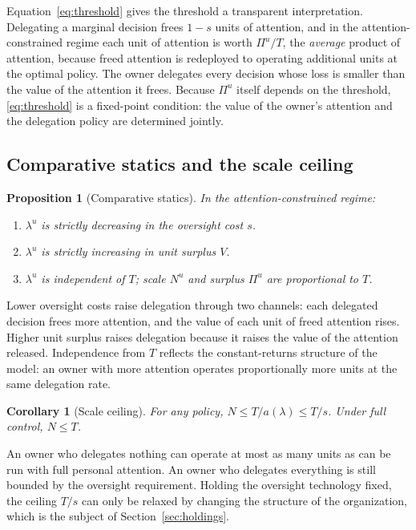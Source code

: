 \documentclass[11pt,a4paper]{article}
\theoremstyle{plain}
\newtheorem{proposition}{Proposition}
\newtheorem{corollary}{Corollary}
\begin{document}
Equation~\eqref{eq:threshold} gives the threshold a transparent interpretation. Delegating a marginal decision frees $1 - s$ units of attention, and in the attention-constrained regime each unit of attention is worth $\Pi^u / T$, the \emph{average} product of attention, because freed attention is redeployed to operating additional units at the optimal policy. The owner delegates every decision whose loss is smaller than the value of the attention it frees. Because $\Pi^u$ itself depends on the threshold, \eqref{eq:threshold} is a fixed-point condition: the value of the owner's attention and the delegation policy are determined jointly.

\subsection{Comparative statics and the scale ceiling}

\begin{proposition}[Comparative statics]\label{prop:cs}
In the attention-constrained regime:
\begin{enumerate}
  \item $\lambda^u$ is strictly decreasing in the oversight cost $s$.
  \item $\lambda^u$ is strictly increasing in unit surplus $V$.
  \item $\lambda^u$ is independent of $T$; scale $N^u$ and surplus $\Pi^u$ are proportional to $T$.
\end{enumerate}
\end{proposition}

Lower oversight costs raise delegation through two channels: each delegated decision frees more attention, and the value of each unit of freed attention rises. Higher unit surplus raises delegation because it raises the value of the attention released. Independence from $T$ reflects the constant-returns structure of the model: an owner with more attention operates proportionally more units at the same delegation rate.

\begin{corollary}[Scale ceiling]\label{cor:ceiling}
For any policy, $N \le T / a(\lambda) \le T / s$. Under full control, $N \le T$.
\end{corollary}

An owner who delegates nothing can operate at most as many units as can be run with full personal attention. An owner who delegates everything is still bounded by the oversight requirement. Holding the oversight technology fixed, the ceiling $T/s$ can only be relaxed by changing the structure of the organization, which is the subject of Section~\ref{sec:holdings}.
\end{document}
